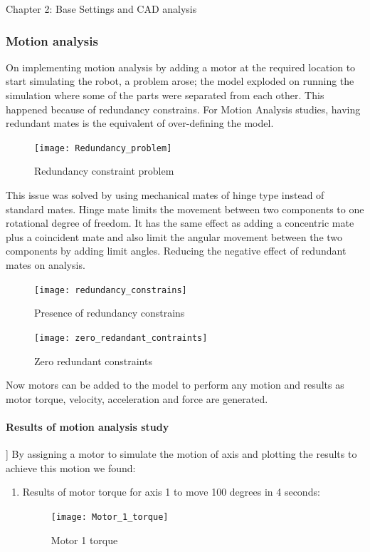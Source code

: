 \documentclass{book}
\begin{document}
\begin{chapter}{Chapter 2: Base Settings and CAD analysis}
\bigskip
\subsubsection{Motion analysis}
On implementing motion analysis by adding a motor at the required location to start simulating the robot, a problem arose; the model exploded on running the simulation where some of the parts were separated from each other. This happened because of redundancy constrains. For Motion Analysis studies, having redundant mates is the equivalent of over-defining the model.  

\begin{figure}[H]
	\centering
	\texttt{[image: Redundancy\_problem]}
	\caption{Redundancy constraint problem}
\end{figure}

This issue was solved by using mechanical mates of hinge type instead of standard mates. Hinge mate limits the movement between two components to one rotational degree of freedom. It has the same effect as adding a concentric mate plus a coincident mate and also limit the angular movement between the two components by adding limit angles. Reducing the negative effect of redundant mates on analysis.

\begin{figure}[H]
	\centering
	\texttt{[image: redundancy\_constrains]}
	\caption{Presence of redundancy constrains}
\end{figure}

\begin{figure}[H]
	\centering
	\texttt{[image: zero\_redandant\_contraints]}
	\caption{Zero redundant constraints}
\end{figure}
\smallskip
Now motors can be added to the model to perform any motion and results as motor torque, velocity, acceleration and force are generated.

\bigskip
\paragraph{Results of motion analysis study}] 
By assigning a motor to simulate the motion of axis and plotting the results to achieve this motion we found:
\begin{enumerate}
	\item Results of motor torque for axis 1 to move 100 degrees in 4 seconds:

	\begin{figure}[H]
		\centering
		\texttt{[image: Motor\_1\_torque]}
		\caption{Motor 1 torque}
	\end{figure}
	

\end{enumerate}
\end{chapter}
\end{document}
